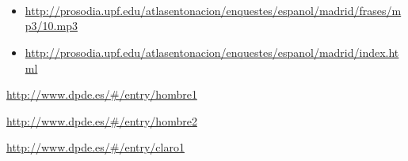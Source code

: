 \section*{}
\begin{description}[font=\normalfont]
\item[\autoref{fig:obviousstatementAIEE}:] ~
\begin{itemize}[leftmargin=*]\sloppy
\item \url{http://prosodia.upf.edu/atlasentonacion/enquestes/espanol/madrid/frases/mp3/10.mp3}
\item \url{http://prosodia.upf.edu/atlasentonacion/enquestes/espanol/madrid/index.html}
\end{itemize}
\item[\autoref{fig:hombre1BRIZ}:] \url{http://www.dpde.es/\#/entry/hombre1}
\item[\autoref{fig:hombre2BRIZ}:] \url{http://www.dpde.es/\#/entry/hombre2}
\item[\autoref{fig:claro1BRIZword} \& \autoref{fig:claro1BRIZsentence}:] \url{http://www.dpde.es/\#/entry/claro1}

\end{description}


